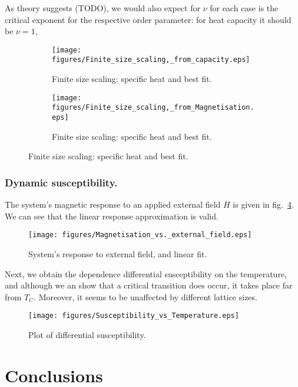 \documentclass[12pt]{article}
\begin{document}
As theory suggests (TODO), we would also expect for \( \nu \) for each case is the critical exponent for the respective order parameter: for heat capacity it should be \( \nu =1\), 

\begin{figure}[p]
  \begin{subfigure}[t] {0.76\textwidth}
    \texttt{[image: figures/Finite\_size\_scaling,\_from\_capacity.eps]}
    \caption{Finite size scaling: specific heat and best fit. }\label{fig:finite_size_scaling_capacity}
  \end{subfigure}
  \begin{subfigure}[b] {0.76\textwidth}
    \texttt{[image: figures/Finite\_size\_scaling,\_from\_Magnetisation.eps]}
    \caption{Finite size scaling: specific heat and best fit. }\label{fig:finite_size_scaling_magnetisation}
  \end{subfigure}
\end{figure}




\subsubsection{Dynamic susceptibility.}

The system's magnetic response to an applied external field \(H\) is given in fig.~\ref{fig:m_vs_h}. We can see that the linear response approximation is valid. 

\begin{figure}[p]
  \texttt{[image: figures/Magnetisation\_vs.\_external\_field.eps]}
  \caption{System's response to external field, and linear fit.}\label{fig:m_vs_h}
\end{figure}

Next, we obtain the dependence differential susceptibility on the temperature, and although we an show that a critical transition does occur, it takes place far from \(T_C\). Moreover, it seems to be unaffected by different lattice sizes.

\begin{figure}[p]
  \texttt{[image: figures/Susceptibility\_vs\_Temperature.eps]}
  \caption{Plot of differential susceptibility. }\label{fig:differential_susceptibility}
\end{figure}

\section{Conclusions}\label{sec:conclusions}
\end{document}
